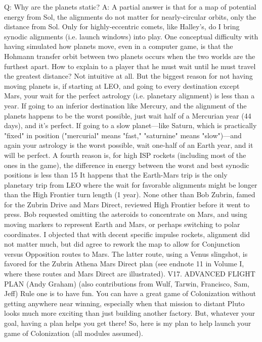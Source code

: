 \documentclass[a4paper]{book}
\begin{document}
Q: Why are the planets static?
A: A partial answer is that for a map of potential energy from Sol, the alignments do not matter for nearly-circular orbits, only the distance from Sol. Only for highly-eccentric comets, like Halley's, do I bring synodic alignments (i.e. launch windows) into play.
One conceptual difficulty with having simulated how planets move, even in a computer game, is that the Hohmann transfer orbit between two planets occurs when the two worlds are the furthest apart. How to explain to a player that he must wait until he must travel the greatest distance? Not intuitive at all.
But the biggest reason for not having moving planets is, if starting at LEO, and going to every destination except Mars, your wait for the perfect astrology (i.e. planetary alignment) is less than a year. If going to an inferior destination like Mercury, and the alignment of the planets happens to be the worst possible, just wait half of a Mercurian year (44 days), and it’s perfect. If going to a slow planet—like Saturn, which is practically "fixed" in position ("mercurial" means "fast," "saturnine" means "slow")—and again your astrology is the worst possible, wait one-half of an Earth year, and it will be perfect.
A fourth reason is, for high ISP rockets (including most of the ones in the game), the difference in energy between the worst and best synodic positions is less than 15%
It happens that the Earth-Mars trip is the only planetary trip from LEO where the wait for favorable alignments might be longer than the High Frontier turn length (1 year). None other than Bob Zubrin, famed for the Zubrin Drive and Mars Direct, reviewed High Frontier before it went to press. Bob requested omitting the asteroids to concentrate on Mars, and using moving markers to represent Earth and Mars, or perhaps switching to polar coordinates. I objected that with decent specific impulse rockets, alignment did not matter much, but did agree to rework the map to allow for Conjunction versus Opposition routes to Mars. The latter route, using a Venus slingshot, is favored for the Zubrin Athena Mars Direct plan (see endnote {11} in Volume I, where these routes and Mars Direct are illustrated).
V17. ADVANCED FLIGHT PLAN (Andy Graham)
 (also contributions from Wulf, Tarwin, Francisco, Sam, Jeff)
Rule one is to have fun. You can have a great game of Colonization without getting anywhere near winning, especially when that mission to distant Pluto looks much more exciting than just building another factory. But, whatever your goal, having a plan helps you get there! So, here is my plan to help launch your game of Colonization (all modules assumed).
\end{document}
